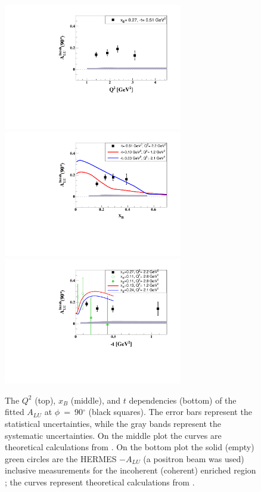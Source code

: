 \documentclass[twocolumn,nofootinbib,showpacs,prl,superscriptaddress,secnumarabic,amssymb,nobibnotes,aps,floatfix]{revtex4}
\begin{document}
\begin{figure}[tb]
\includegraphics[width=7.8cm]{figs/ALU_90_p_vs_Q2_shortscenrario.pdf}
\includegraphics[width=7.8cm]{figs/ALU_90_p_vs_x_shortscenrario.pdf}
\includegraphics[width=7.8cm]{figs/ALU_90_p_vs_t_shortscenrario.pdf}
\caption{The $Q^{2}$ (top), $x_{B}$ (middle), and $t$ dependencies (bottom) of
   the fitted $A_{LU}$ at $\phi$~=~90$^{\circ}$ (black squares). The error bars 
   represent the statistical uncertainties, while the gray bands represent the 
   systematic uncertainties. On the middle plot the curves are theoretical 
   calculations from \cite{simonetta_2}. On the bottom plot the solid (empty) 
   green circles are the HERMES $-A_{LU}$ (a positron beam was used) inclusive 
   measurements for the incoherent (coherent) enriched region 
   \cite{Airapetian:2009cga}; the curves represent theoretical calculations 
   from \cite{simonetta_2}.  } \label{fig:alu90}
\end{figure}
\end{document}
